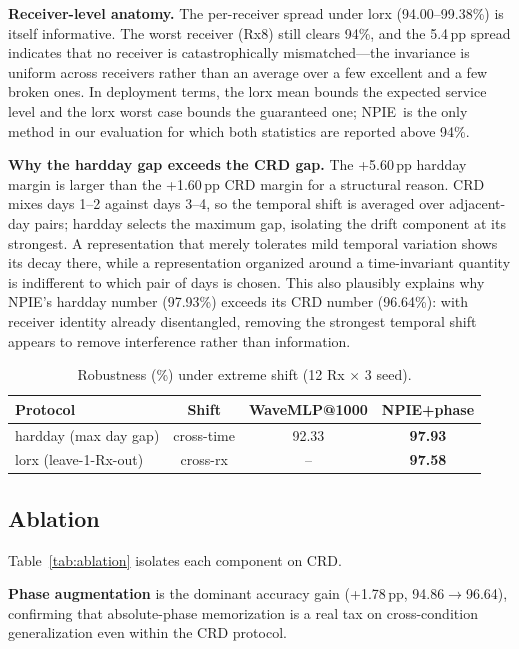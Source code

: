 \documentclass[journal]{IEEEtran}
\newcommand{\npie}{\textsc{NPIE}}
\begin{document}
\textbf{Receiver-level anatomy.} The per-receiver spread under lorx (94.00--99.38\%) is itself informative. The worst receiver (Rx8) still clears 94\%, and the 5.4\,pp spread indicates that no receiver is catastrophically mismatched---the invariance is uniform across receivers rather than an average over a few excellent and a few broken ones. In deployment terms, the lorx mean bounds the expected service level and the lorx worst case bounds the guaranteed one; \npie\ is the only method in our evaluation for which both statistics are reported above 94\%.

\textbf{Why the hardday gap exceeds the CRD gap.} The +5.60\,pp hardday margin is larger than the +1.60\,pp CRD margin for a structural reason. CRD mixes days 1--2 against days 3--4, so the temporal shift is averaged over adjacent-day pairs; hardday selects the maximum gap, isolating the drift component at its strongest. A representation that merely tolerates mild temporal variation shows its decay there, while a representation organized around a time-invariant quantity is indifferent to which pair of days is chosen. This also plausibly explains why \npie's hardday number (97.93\%) exceeds its CRD number (96.64\%): with receiver identity already disentangled, removing the strongest temporal shift appears to remove interference rather than information.

\begin{table}[t]
\centering
\footnotesize
\caption{Robustness (\%) under extreme shift (12 Rx $\times$ 3 seed).}
\label{tab:robust}
\begin{tabular}{@{}lccc@{}}
\toprule
Protocol & Shift & WaveMLP@1000 & NPIE+phase \\
\midrule
hardday (max day gap) & cross-time & 92.33 & \textbf{97.93} \\
lorx (leave-1-Rx-out) & cross-rx & -- & \textbf{97.58} \\
\bottomrule
\end{tabular}
\end{table}

\subsection{Ablation}
\label{sec:ablation}
Table~\ref{tab:ablation} isolates each component on CRD.

\textbf{Phase augmentation} is the dominant accuracy gain (+1.78\,pp, 94.86$\to$96.64), confirming that absolute-phase memorization is a real tax on cross-condition generalization even within the CRD protocol.
\end{document}

